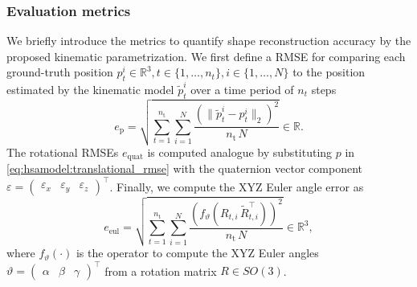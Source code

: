 \subsubsection{Evaluation metrics}\label{ssub:hsamodel:hsa_rod_kinematics:evaluation_metrics}
We briefly introduce the metrics to quantify shape reconstruction accuracy by the proposed kinematic parametrization. 
We first define a \gls{RMSE} for comparing each ground-truth position $p_t^i \in \mathbb{R}^{3}, t \in \{1,\dots,n_t\}, i \in \{1,\dots,N\}$ to the position estimated by the kinematic model $\tilde{p}_t^i$ over a time period of $n_t$ steps
\begin{equation}\label{eq:hsamodel:translational_rmse}
    e_{\mathrm{p}} = \sqrt{\sum_{t = 1}^{n_\mathrm{t}} \sum_{i = 1}^{N} \frac{\left (\big\lVert \tilde{p}_t^i - p_t^i \big\rVert_2 \right )^2}{n_\mathrm{t} \, N}}  \in \mathbb{R}.
\end{equation}
The rotational \glspl{RMSE} $e_{\mathrm{quat}}$ is computed analogue by substituting $p$ in \eqref{eq:hsamodel:translational_rmse} with the quaternion vector component $\varepsilon = \begin{pmatrix}\varepsilon_x & \varepsilon_y & \varepsilon_z \end{pmatrix}^\top$.
Finally, we compute the XYZ Euler angle error as 
\begin{equation}
    e_\mathrm{eul} = \sqrt{\sum_{t = 1}^{n_\mathrm{t}} \sum_{i = 1}^{N} \frac{\left ( f_\vartheta(R_{t,i} \, \tilde{R}_{t,i}^\top) \right )^2}{n_\mathrm{t} \, N}} \in \mathbb{R}^3,
\end{equation}
where $f_\vartheta(\cdot)$ is the operator to compute the XYZ Euler angles $\vartheta = \begin{pmatrix}\alpha & \beta & \gamma \end{pmatrix}^\top$ from a rotation matrix $R \in SO(3)$.

